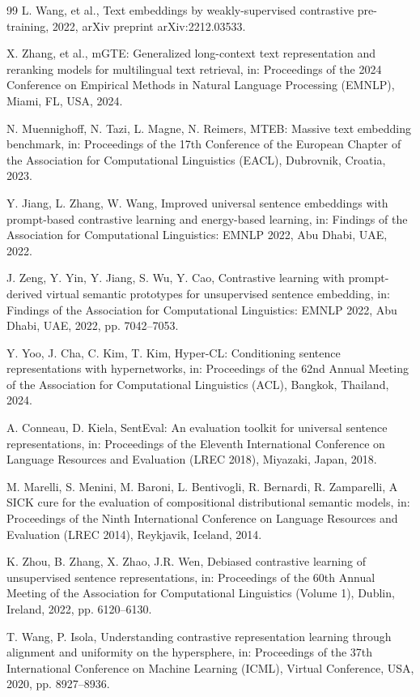 \documentclass[a4paper,fleqn]{cas-dc}
\begin{document}
\begin{thebibliography}{99}
L. Wang, et al., Text embeddings by weakly-supervised contrastive pre-training, 2022, arXiv preprint arXiv:2212.03533.

X. Zhang, et al., mGTE: Generalized long-context text representation and reranking models for multilingual text retrieval, in: Proceedings of the 2024 Conference on Empirical Methods in Natural Language Processing (EMNLP), Miami, FL, USA, 2024.

N. Muennighoff, N. Tazi, L. Magne, N. Reimers, MTEB: Massive text embedding benchmark, in: Proceedings of the 17th Conference of the European Chapter of the Association for Computational Linguistics (EACL), Dubrovnik, Croatia, 2023.

Y. Jiang, L. Zhang, W. Wang, Improved universal sentence embeddings with prompt-based contrastive learning and energy-based learning, in: Findings of the Association for Computational Linguistics: EMNLP 2022, Abu Dhabi, UAE, 2022.

J. Zeng, Y. Yin, Y. Jiang, S. Wu, Y. Cao, Contrastive learning with prompt-derived virtual semantic prototypes for unsupervised sentence embedding, in: Findings of the Association for Computational Linguistics: EMNLP 2022, Abu Dhabi, UAE, 2022, pp. 7042--7053.

Y. Yoo, J. Cha, C. Kim, T. Kim, Hyper-CL: Conditioning sentence representations with hypernetworks, in: Proceedings of the 62nd Annual Meeting of the Association for Computational Linguistics (ACL), Bangkok, Thailand, 2024.

A. Conneau, D. Kiela, SentEval: An evaluation toolkit for universal sentence representations, in: Proceedings of the Eleventh International Conference on Language Resources and Evaluation (LREC 2018), Miyazaki, Japan, 2018.

M. Marelli, S. Menini, M. Baroni, L. Bentivogli, R. Bernardi, R. Zamparelli, A SICK cure for the evaluation of compositional distributional semantic models, in: Proceedings of the Ninth International Conference on Language Resources and Evaluation (LREC 2014), Reykjavik, Iceland, 2014.

K. Zhou, B. Zhang, X. Zhao, J.R. Wen, Debiased contrastive learning of unsupervised sentence representations, in: Proceedings of the 60th Annual Meeting of the Association for Computational Linguistics (Volume 1), Dublin, Ireland, 2022, pp. 6120--6130.

T. Wang, P. Isola, Understanding contrastive representation learning through alignment and uniformity on the hypersphere, in: Proceedings of the 37th International Conference on Machine Learning (ICML), Virtual Conference, USA, 2020, pp. 8927--8936.

\end{thebibliography}
\end{document}
